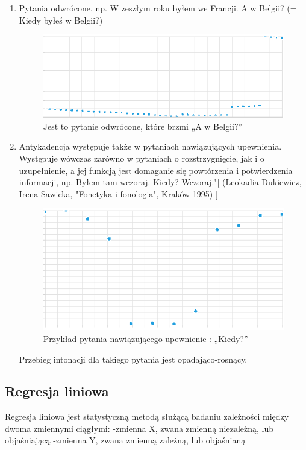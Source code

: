 \documentclass[a4paper,12 pt]{article}
\begin{document}
\begin{enumerate}
\begin{enumerate}
\item Pytania odwrócone, np. W zeszłym roku byłem we Francji. A w Belgii? (= Kiedy byłeś w Belgii?) 
\begin{figure}[h]
\centering
\includegraphics[scale=0.9]{pytanie_odwrocone.png}
\caption{Jest to pytanie odwrócone, które brzmi „A w Belgii?”}
\end{figure}
\FloatBarrier
\item Antykadencja występuje  także w pytaniach nawiązujących upewnienia. Występuje wówczas zarówno w  pytaniach o rozstrzygnięcie, jak i o uzupełnienie, a jej funkcją jest domaganie  się powtórzenia i potwierdzenia informacji, np. Byłem tam wczoraj. Kiedy?  Wczoraj."[  (Leokadia Dukiewicz, Irena Sawicka, "Fonetyka i fonologia", Kraków 1995) ]
\begin{figure}[h]

\centering
\includegraphics[scale=0.9]{kiedy.png}
\caption{Przykład pytania nawiązującego upewnienie : „Kiedy?”}
\end{figure}
\FloatBarrier
Przebieg intonacji dla takiego pytania jest opadająco-rosnący.
\end{enumerate}
\end{enumerate}
\subsection{Regresja liniowa}
Regresja liniowa jest statystyczną metodą służącą badaniu zależności między dwoma zmiennymi ciągłymi:
\newline-zmienna X, zwana zmienną niezależną, lub objaśniającą
\newline-zmienna Y, zwana zmienną zależną, lub objaśnianą
\end{document}
